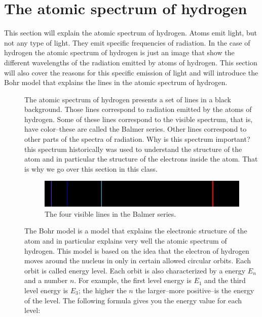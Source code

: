 \documentclass[main.tex]{subfiles}
\begin{document}
\section{The atomic spectrum of hydrogen}
This section will explain the atomic spectrum of hydrogen. Atoms emit light, but not any type of light. They emit specific frequencies of radiation. In the case of hydrogen the atomic spectrum of hydrogen is just an image that show the different wavelengths of the radiation emitted by atoms of hydrogen. This section will also cover the reasons for this specific emission of light and will introduce the Bohr model that explains the lines in the atomic spectrum of hydrogen.
\sloppy
\begin{description}
\item[]
The atomic spectrum of hydrogen presents a set of lines in a black background. Those lines correspond to radiation emitted by the atoms of hydrogen. Some of these lines correspond to the visible spectrum, that is, have color--these are called the Balmer series. Other lines correspond to other parts of the spectra of radiation. Why is this spectrum important? this spectrum historically was used to understand the structure of the atom and in particular the structure of the electrons inside the atom. That is why we go over this section in this class.
\begin{figure}[h] %
\includegraphics[width=0.8\columnwidth]{chapter3/figure1-3}
    \caption{The four visible lines in the Balmer series. } \end{figure}%
\item[]
The Bohr model is a model that explains the electronic structure of the atom and in particular explains very well the atomic spectrum of hydrogen. This model is based on the idea that the electron of hydrogen moves around the nucleus in only in certain allowed circular orbits. Each orbit is called energy level. Each orbit is also characterized by a energy  $E_n$ and a number $n$. For example, the first level energy is  $E_1$ and the third level energy is $E_3$; the higher the $n$ the larger--more positive--is the energy of the level. The following formula gives you the energy value for each level:

\end{description}
\end{document}
